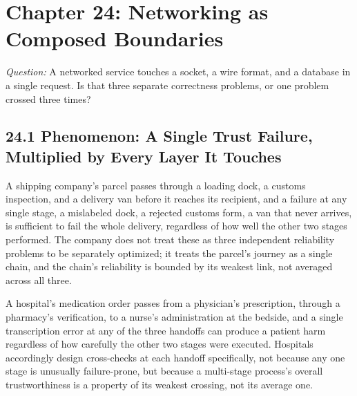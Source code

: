 \documentclass[11pt]{book}
\begin{document}
\clearpage

\chapter*{Chapter 24: Networking as Composed Boundaries}

\begin{firstprinciples}
\textit{Question:} A networked service touches a socket, a wire format, and a database in a single request. Is that three separate correctness problems, or one problem crossed three times?
\end{firstprinciples}

\section*{24.1 Phenomenon: A Single Trust Failure, Multiplied by Every Layer It Touches}

A shipping company's parcel passes through a loading dock, a customs inspection, and a delivery van before it reaches its recipient, and a failure at any single stage, a mislabeled dock, a rejected customs form, a van that never arrives, is sufficient to fail the whole delivery, regardless of how well the other two stages performed. The company does not treat these as three independent reliability problems to be separately optimized; it treats the parcel's journey as a single chain, and the chain's reliability is bounded by its weakest link, not averaged across all three.

A hospital's medication order passes from a physician's prescription, through a pharmacy's verification, to a nurse's administration at the bedside, and a single transcription error at any of the three handoffs can produce a patient harm regardless of how carefully the other two stages were executed. Hospitals accordingly design cross-checks at each handoff specifically, not because any one stage is unusually failure-prone, but because a multi-stage process's overall trustworthiness is a property of its weakest crossing, not its average one.
\end{document}
